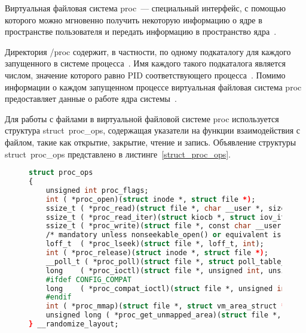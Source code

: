 Виртуальная файловая система proc~--- специальный интерфейс, с помощью которого можно мгновенно получить некоторую информацию о ядре в пространстве пользователя и передать информацию в пространство ядра~\cite{proc}.

Директория /proc содержит, в частности, по одному подкаталогу для каждого запущенного в системе процесса~\cite{proc}.
Имя каждого такого подкаталога является числом, значение которого равно PID соответствующего процесса~\cite{proc}.
Помимо информации о каждом запущенном процессе виртуальная файловая система proc предоставляет данные о работе ядра системы~\cite{proc}.

Для работы с файлами в виртуальной файловой системе proc используется структура struct~proc\_ops, содержащая указатели на функции взаимодействия с файлом, такие как открытие, закрытие, чтение и запись.
Объявление структуры struct~proc\_ops представлено в листинге~\ref{struct_proc_ops}.
\begin{figure}[H]
	\begin{lstlisting}[label=struct_proc_ops,caption=Объявление структуры struct~proc\_ops (версия ядра Linux~--- 6.5.13),language=Caml]
struct proc_ops
{
	unsigned int proc_flags;
	int	( *proc_open)(struct inode *, struct file *);
	ssize_t	( *proc_read)(struct file *, char __user *, size_t, loff_t *);
	ssize_t ( *proc_read_iter)(struct kiocb *, struct iov_iter *);
	ssize_t	( *proc_write)(struct file *, const char __user *, size_t, loff_t *);
	/* mandatory unless nonseekable_open() or equivalent is used */
	loff_t	( *proc_lseek)(struct file *, loff_t, int);
	int	( *proc_release)(struct inode *, struct file *);
	__poll_t ( *proc_poll)(struct file *, struct poll_table_struct *);
	long	( *proc_ioctl)(struct file *, unsigned int, unsigned long);
	#ifdef CONFIG_COMPAT
	long	( *proc_compat_ioctl)(struct file *, unsigned int, unsigned long);
	#endif
	int	( *proc_mmap)(struct file *, struct vm_area_struct *);
	unsigned long ( *proc_get_unmapped_area)(struct file *, unsigned long, unsigned long, unsigned long, unsigned long);
} __randomize_layout;
	\end{lstlisting}
\end{figure}

